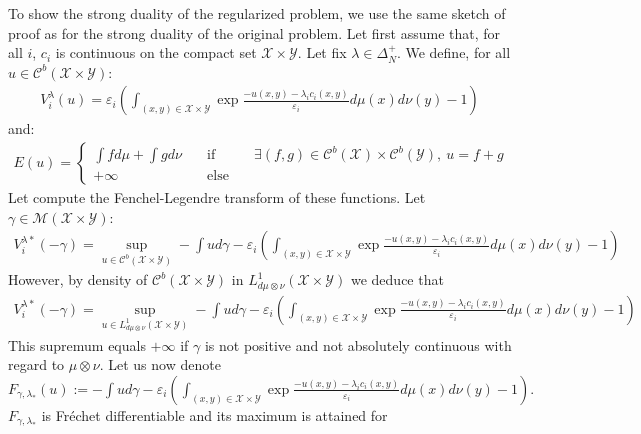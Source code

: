 \label{prv:duality-entropic}
\begin{prv*}
To show the strong duality of the regularized problem, we use the same sketch of proof as for the strong duality of the original problem. 
\medskip
Let first assume that, for all $i$, $c_i$ is continuous on the compact set $\mathcal{X}\times\mathcal{Y}$. Let fix $\lambda\in\Delta_N^{+}$. We define, for all $u\in\mathcal{C}^b(\mathcal{X}\times\mathcal{Y})$:
\begin{align*}
    V^\lambda_i(u) = \varepsilon_i\left(\int_{(x,y)\in\mathcal{X}\times\mathcal{Y}} \exp{\frac{-u(x,y)-\lambda_ic_i(x,y)}{\varepsilon_i}}d\mu(x)d\nu(y)-1\right)
\end{align*}
and:
\begin{align*}
E(u)=\left\{\begin{matrix} \int fd\mu+\int gd\nu &\quad\text{if}\quad& \exists (f,g)\in \mathcal{C}^b(\mathcal{X})\times\mathcal{C}^b(\mathcal{Y}),~ u = f+g\\
+\infty &\quad\text{else}\quad&\end{matrix}\right.
\end{align*}
Let compute the Fenchel-Legendre transform of these functions. Let $\gamma\in\mathcal{M}(\mathcal{X}\times\mathcal{Y})$:
\begin{align*}
    V^{\lambda*}_i(-\gamma) = \sup_{u\in\mathcal{C}^b(\mathcal{X}\times\mathcal{Y})}-\int ud\gamma -\varepsilon_i\left(\int_{(x,y)\in\mathcal{X}\times\mathcal{Y}} \exp{\frac{-u(x,y)-\lambda_ic_i(x,y)}{\varepsilon_i}}d\mu(x)d\nu(y)-1\right) 
\end{align*}
However, by density of $\mathcal{C}^b(\mathcal{X}\times\mathcal{Y})$ in $L^1_{d\mu\otimes\nu}(\mathcal{X}\times\mathcal{Y})$ we deduce that
\begin{align*}
    V^{\lambda*}_i(-\gamma) = \sup_{u\in L^1_{d\mu\otimes\nu}(\mathcal{X}\times\mathcal{Y})}-\int ud\gamma -\varepsilon_i\left(\int_{(x,y)\in\mathcal{X}\times\mathcal{Y}} \exp{\frac{-u(x,y)-\lambda_ic_i(x,y)}{\varepsilon_i}}d\mu(x)d\nu(y)-1\right) 
\end{align*}
This supremum equals $+\infty$ if $\gamma$ is not positive and not absolutely continuous with regard to $\mu\otimes \nu$. Let us now denote 
$F_{\gamma,\lambda_*}(u):=-\int ud\gamma -\varepsilon_i\left(\int_{(x,y)\in\mathcal{X}\times\mathcal{Y}} \exp{\frac{-u(x,y)-\lambda_ic_i(x,y)}{\varepsilon_i}}d\mu(x)d\nu(y)-1\right).$
$F_{\gamma,\lambda_*}$ is Fréchet differentiable and its maximum is attained for 

\end{prv*}
